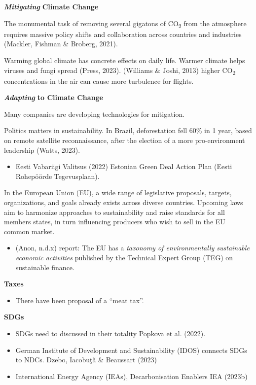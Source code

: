 \documentclass[
  letterpaper,
  DIV=11,
  numbers=noendperiod]{scrartcl}
\providecommand{\tightlist}{%
  \setlength{\itemsep}{0pt}\setlength{\parskip}{0pt}}\usepackage{longtable,booktabs,array}
\begin{document}
\textbf{\emph{Mitigating}} \textbf{Climate Change}

The monumental task of removing several gigatons of CO\textsubscript{2}
from the atmosphere requires massive policy shifts and collaboration
across countries and industries (Mackler, Fishman \& Broberg, 2021).

Warming global climate has concrete effects on daily life. Warmer
climate helps viruses and fungi spread (Press, 2023). (Williams \&
Joshi, 2013) higher CO\textsubscript{2} concentrations in the air can
cause more turbulence for flights.

\textbf{\emph{Adapting}} \textbf{to Climate Change}

Many companies are developing technologies for mitigation.

Politics matters in sustainability. In Brazil, deforestation fell 60\%
in 1 year, based on remote satellite reconnaissance, after the election
of a more pro-environment leadership (Watts, 2023).

\begin{itemize}
\tightlist
\item
  Eesti Vabariigi Valitsus (2022) Estonian Green Deal Action Plan (Eesti
  Rohepöörde Tegevusplaan).
\end{itemize}

In the European Union (EU), a wide range of legislative proposals,
targets, organizations, and goals already exists across diverse
countries. Upcoming laws aim to harmonize approaches to sustainability
and raise standards for all members states, in turn influencing
producers who wish to sell in the EU common market.

\begin{itemize}
\tightlist
\item
  (Anon, n.d.x) report: The EU has a \emph{taxonomy of environmentally
  sustainable economic activities} published by the Technical Expert
  Group (TEG) on sustainable finance.
\end{itemize}

\textbf{Taxes}

\begin{itemize}
\tightlist
\item
  There have been proposal of a ``meat tax''.
\end{itemize}

\textbf{SDGs}

\begin{itemize}
\item
  SDGs need to discussed in their totality Popkova et al. (2022).
\item
  German Institute of Development and Sustainability (IDOS) connects
  SDGs to NDCs. Dzebo, Iacobuţă \& Beaussart (2023)
\item
  International Energy Agency (IEAs), Decarbonisation Enablers IEA
  (2023b)
\end{itemize}
\end{document}
